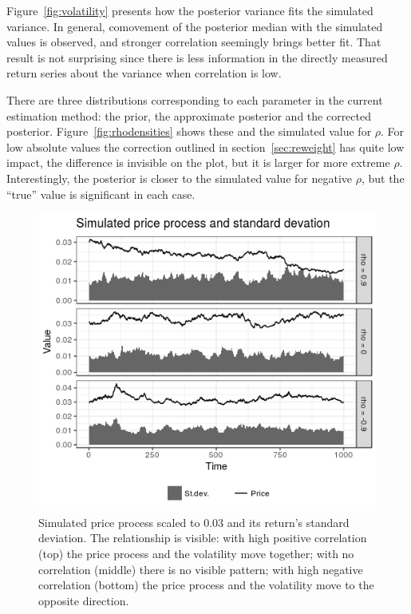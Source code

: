 Figure~\ref{fig:volatility} presents how the posterior variance fits the simulated variance.
In general, comovement of the posterior median with the simulated values is observed, and stronger correlation seemingly brings better fit.
That result is not surprising since there is less information in the directly measured return series about the variance when correlation is low.

There are three distributions corresponding to each parameter in the current estimation method: the prior, the approximate posterior and the corrected posterior.
Figure~\ref{fig:rhodensities} shows these and the simulated value for $\rho$.
For low absolute values the correction outlined in section~\ref{sec:reweight} has quite low impact, the difference is invisible on the plot, but it is larger for more extreme $\rho$.
Interestingly, the posterior is closer to the simulated value for negative $\rho$, but the ``true'' value is significant in each case.

\begin{figure}
	\centering
	\includegraphics[width=\linewidth]{simulations/data-plot}
	\caption[Simulated price process and standard deviation]{Simulated price process scaled to 0.03 and its return's standard deviation. The relationship is visible: with high positive correlation (top) the price process and the volatility move together; with no correlation (middle) there is no visible pattern; with high negative correlation (bottom) the price process and the volatility move to the opposite direction.}
	\label{fig:simdata}
\end{figure}

